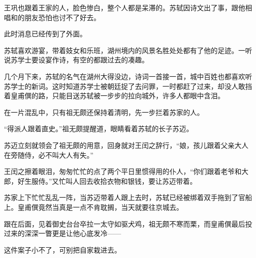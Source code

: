王巩也跟着王家的人，脸色惨白，整个人都是呆滞的。苏轼因诗文出了事，跟他相唱和的朋友恐怕也讨不了好去。

此时消息已经传到了外面。

苏轼喜欢游宴，带着妓女和乐班，湖州境内的风景名胜处处都有了他的足迹。一听说苏学士要设宴作诗，有空的都跟过去的凑趣。

几个月下来，苏轼的名气在湖州大得没边，诗词一首接一首，城中百姓也都喜欢听苏学士的新词。这时知道苏学士被朝廷捉了去问罪，一时都赶了过来，却没人敢挡着皇甫僎的路，只能目送苏轼被一步步的拉向城外，许多人都眼中含泪。

在一片混乱中，只有祖无颇还保持着清明，先一步拦着苏家的人。

“得派人跟着直史。”祖无颇提醒道，眼睛看着苏轼的长子苏迈。

苏迈立刻就领会了祖无颇的用意，回身就对王闰之辞行，“娘，孩儿跟着父亲大人在旁随侍，必不叫大人有失。”

王闰之擦着眼泪，匆匆忙忙的点了两个平日里惯得用的仆人，“你们跟着老爷和大郎，好生服侍。”又忙叫人回去收拾衣物和银钱，要让苏迈带着。

苏家上下忙忙乱乱一阵，当苏迈带着人跟上去时，苏轼已经被绑着双手拖到了官船上。皇甫僎竟然当真是一点不肯耽搁，当天就要往京城去。

跟在后面，见着御史台台卒拉一太守如驱犬鸡，祖无颇不寒而栗，而皇甫僎最后投过来的深深一瞥更是让他心底发冷——

这件案子小不了，可别把自家栽进去。

